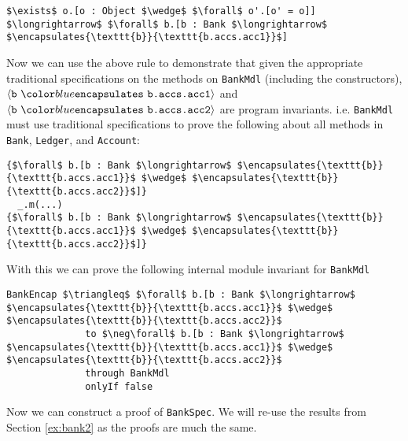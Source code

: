 \begin{lstlisting}[language = Chainmail, mathescape=true, frame=single]
$\exists$ o.[o : Object $\wedge$ $\forall$ o'.[o' = o]] $\longrightarrow$ $\forall$ b.[b : Bank $\longrightarrow$ $\encapsulates{\texttt{b}}{\texttt{b.accs.acc1}}$]
\end{lstlisting}
Now we can use the above rule to demonstrate that given the appropriate
traditional specifications on the methods on \texttt{BankMdl} (including the constructors), 
$\encapsulates{\texttt{b}}{\texttt{b.accs.acc1}}$ and $\encapsulates{\texttt{b}}{\texttt{b.accs.acc2}}$ 
are program invariants. i.e. \texttt{BankMdl} must use traditional specifications to 
prove the following about all methods in \texttt{Bank}, \texttt{Ledger}, and \texttt{Account}:
\begin{lstlisting}[language = Chainmail, mathescape=true, frame=lines]
{$\forall$ b.[b : Bank $\longrightarrow$ $\encapsulates{\texttt{b}}{\texttt{b.accs.acc1}}$ $\wedge$ $\encapsulates{\texttt{b}}{\texttt{b.accs.acc2}}$]}
  _.m(...)
{$\forall$ b.[b : Bank $\longrightarrow$ $\encapsulates{\texttt{b}}{\texttt{b.accs.acc1}}$ $\wedge$ $\encapsulates{\texttt{b}}{\texttt{b.accs.acc2}}$]}
\end{lstlisting}
With this we can prove the following internal module invariant for \texttt{BankMdl}
\begin{lstlisting}[language = Chainmail, mathescape=true, frame=lines]
BankEncap $\triangleq$ $\forall$ b.[b : Bank $\longrightarrow$ $\encapsulates{\texttt{b}}{\texttt{b.accs.acc1}}$ $\wedge$ $\encapsulates{\texttt{b}}{\texttt{b.accs.acc2}}$
              to $\neg\forall$ b.[b : Bank $\longrightarrow$ $\encapsulates{\texttt{b}}{\texttt{b.accs.acc1}}$ $\wedge$ $\encapsulates{\texttt{b}}{\texttt{b.accs.acc2}}$
              through BankMdl
              onlyIf false
\end{lstlisting}

Now we can construct a proof of \texttt{BankSpec}. We will re-use the results from Section \ref{ex:bank2} 
as the proofs are much the same.

